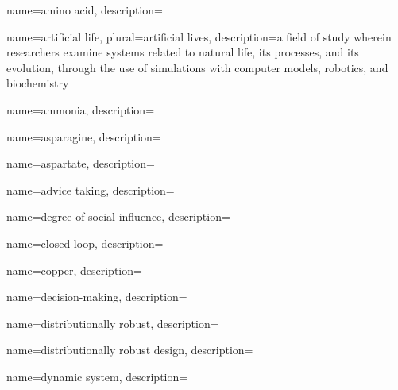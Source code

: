 


	{
		name={amino acid},
		description={}
	}


	{
		name={artificial life},
		plural={artificial lives},
		description={a field of study wherein researchers examine systems related to natural life, its processes, and its evolution, through the use of simulations with computer models, robotics, and biochemistry}
	}
	
	{
		name={ammonia},
		description={}
	}	
	
	{
		name={asparagine},
		description={}
	}

	{
		name={aspartate},
		description={}
	}		

	{
		name={advice taking},
		description={}
	}	


	{
		name={degree of social influence},
		description={}
	}


	{
		name={closed-loop},
		description={}
	}	

	{
		name={copper},
		description={}
	}	
	

	{
		name={decision-making},
		description={}
	}

	{
		name={distributionally robust},
		description={}
	}
	
	{
		name={distributionally robust design},
		description={}
	}
	
	{
		name={dynamic system},
		description={}
	}		

